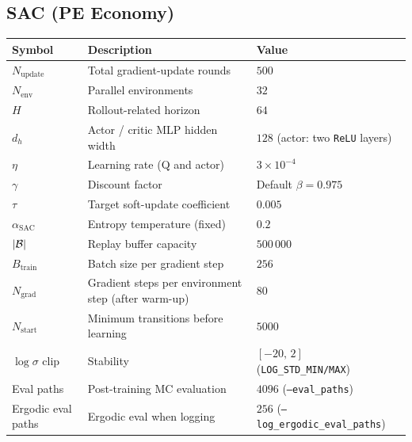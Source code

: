 \subsection{SAC (PE Economy)}
\label{appendix_hyper_sac_pe}
\begin{table}[H]
  \centering
  \small
  \setlength{\tabcolsep}{6pt}
  \renewcommand{\arraystretch}{1.15}
  \begin{tabular}{@{}p{2.4cm}p{6.2cm}p{4.8cm}@{}}
    \toprule
    Symbol & Description & Value \\
    \midrule
    $N_{\mathrm{update}}$ & Total gradient-update rounds & $500$ \\
    $N_{\mathrm{env}}$ & Parallel environments & $32$ \\
    $H$ & Rollout-related horizon & $64$ \\
    $d_h$ & Actor / critic MLP hidden width & $128$ (actor: two \texttt{ReLU} layers) \\
    $\eta$ & Learning rate (Q and actor) & $3\times 10^{-4}$ \\
    $\gamma$ & Discount factor & Default $\beta=0.975$ \\
    $\tau$ & Target soft-update coefficient & $0.005$ \\
    $\alpha_{\mathrm{SAC}}$ & Entropy temperature (fixed) & $0.2$ \\
    $|{\cal B}|$ & Replay buffer capacity & $500\,000$ \\
    $B_{\mathrm{train}}$ & Batch size per gradient step & $256$ \\
    $N_{\mathrm{grad}}$ & Gradient steps per environment step (after warm-up) & $80$ \\
    $N_{\mathrm{start}}$ & Minimum transitions before learning & $5000$ \\
    $\log\sigma$ clip & Stability & $[-20,\,2]$ (\texttt{LOG\_STD\_MIN/MAX}) \\
    Eval paths & Post-training MC evaluation & $4096$ (\texttt{--eval\_paths}) \\
    Ergodic eval paths & Ergodic eval when logging & $256$ (\texttt{--log\_ergodic\_eval\_paths}) \\
    \bottomrule
  \end{tabular}
\end{table}

